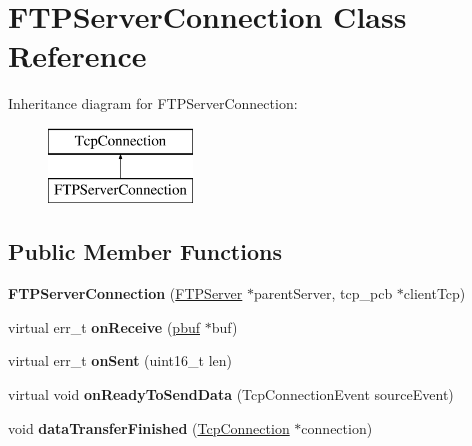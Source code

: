 \hypertarget{class_f_t_p_server_connection}{}\section{F\+T\+P\+Server\+Connection Class Reference}
\label{class_f_t_p_server_connection}
Inheritance diagram for F\+T\+P\+Server\+Connection\+:\begin{figure}[H]
\begin{center}
\leavevmode
\includegraphics[height=2.000000cm]{class_f_t_p_server_connection}
\end{center}
\end{figure}
\subsection*{Public Member Functions}
\begin{DoxyCompactItemize}
\item 
\hypertarget{class_f_t_p_server_connection_aacecab901ba08f31707c8b151b39aa0b}{}{\bfseries F\+T\+P\+Server\+Connection} (\hyperlink{class_f_t_p_server}{F\+T\+P\+Server} $\ast$parent\+Server, tcp\+\_\+pcb $\ast$client\+Tcp)\label{class_f_t_p_server_connection_aacecab901ba08f31707c8b151b39aa0b}

\item 
\hypertarget{class_f_t_p_server_connection_a40eb5a9cd076787f023ad736e55b1386}{}virtual err\+\_\+t {\bfseries on\+Receive} (\hyperlink{structpbuf}{pbuf} $\ast$buf)\label{class_f_t_p_server_connection_a40eb5a9cd076787f023ad736e55b1386}

\item 
\hypertarget{class_f_t_p_server_connection_ad47f32a37c2cf7bb69082ab1b217955d}{}virtual err\+\_\+t {\bfseries on\+Sent} (uint16\+\_\+t len)\label{class_f_t_p_server_connection_ad47f32a37c2cf7bb69082ab1b217955d}

\item 
\hypertarget{class_f_t_p_server_connection_a3352742c3dff1a7405703bb04bcce16c}{}virtual void {\bfseries on\+Ready\+To\+Send\+Data} (Tcp\+Connection\+Event source\+Event)\label{class_f_t_p_server_connection_a3352742c3dff1a7405703bb04bcce16c}

\item 
\hypertarget{class_f_t_p_server_connection_a5d5d227c7a274938e303fee4df39c53c}{}void {\bfseries data\+Transfer\+Finished} (\hyperlink{class_tcp_connection}{Tcp\+Connection} $\ast$connection)\label{class_f_t_p_server_connection_a5d5d227c7a274938e303fee4df39c53c}

\end{DoxyCompactItemize}

